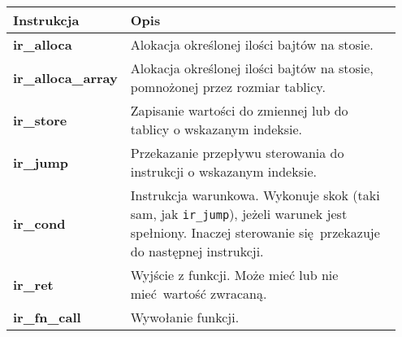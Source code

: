 \documentclass[leqno, 12pt]{article}
\newcommand{\spacing}{\vskip 0.5cm}
\begin{document}
		\begin{center}
			\setlength{\tabcolsep}{0.5em}
			\renewcommand{\arraystretch}{1.5}
			\begin{tabular}{| L{0.2\linewidth} | L{0.75\linewidth} | }
				\hline
				\textbf{Instrukcja} & \textbf{Opis} \\
				\hline
				\textcolor{instrc}{\textbf{ir\_alloca}}
					& Alokacja określonej ilości bajtów
                     na stosie. \\
				\hline
				\textcolor{instrc}{\textbf{ir\_alloca\_array}}
                	& Alokacja określonej ilości bajtów
					  na stosie, pomnożonej przez rozmiar
                      tablicy. \\
				\hline
				\textcolor{instrc}{\textbf{ir\_store}} 
					& Zapisanie wartości do zmiennej
                      lub do tablicy o wskazanym
                      indeksie. \\
				\hline

				\textcolor{instrc}{\textbf{ir\_jump}}
					& Przekazanie przepływu sterowania
                      do instrukcji o wskazanym indeksie. \\
				\hline
				\textcolor{instrc}{\textbf{ir\_cond}}
					& Instrukcja warunkowa. Wykonuje skok
             	     (taki sam, jak \texttt{ir\_jump}),
                      jeżeli warunek jest spełniony.
                      Inaczej sterowanie się przekazuje
                      do następnej instrukcji. \\
  				\hline
  				\textcolor{instrc}{\textbf{ir\_ret}}
  					& Wyjście z funkcji. Może mieć lub nie
                      mieć wartość zwracaną. \\
      			\hline
      			\textcolor{instrc}{\textbf{ir\_fn\_call}}
                    & Wywołanie funkcji. \\
                \hline
			\end{tabular}
		\end{center}
		
		\spacing
\end{document}
